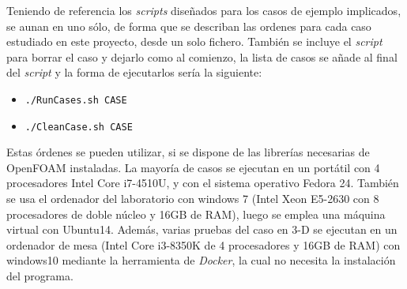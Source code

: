 Teniendo de referencia los \emph{scripts} diseñados para los casos de
ejemplo implicados, se aunan en uno sólo, de forma que se describan las
ordenes para cada caso estudiado en este proyecto, desde un solo
fichero. También se incluye el \emph{script} para borrar el caso y
dejarlo como al comienzo, la lista de casos se añade al final del
\emph{script} y la forma de ejecutarlos sería la siguiente:

\begin{itemize}
\item
  \lstinline[style=bash]{./RunCases.sh CASE}
\item
  \lstinline[style=bash]{./CleanCase.sh CASE}
\end{itemize}

Estas órdenes se pueden utilizar, si se dispone de las librerías
necesarias de OpenFOAM instaladas. La mayoría de casos se ejecutan en un
portátil con 4 procesadores Intel Core i7-4510U, y con el sistema
operativo Fedora 24. También se usa el ordenador del laboratorio con
windows 7 (Intel Xeon E5-2630 con 8 procesadores de doble núcleo y 16GB
de RAM), luego se emplea una máquina virtual con Ubuntu14. Además,
varias pruebas del caso en 3-D se ejecutan en un ordenador de mesa
(Intel Core i3-8350K de 4 procesadores y 16GB de RAM) con windows10
mediante la herramienta de \emph{Docker}, la cual no necesita la
instalación del programa.
